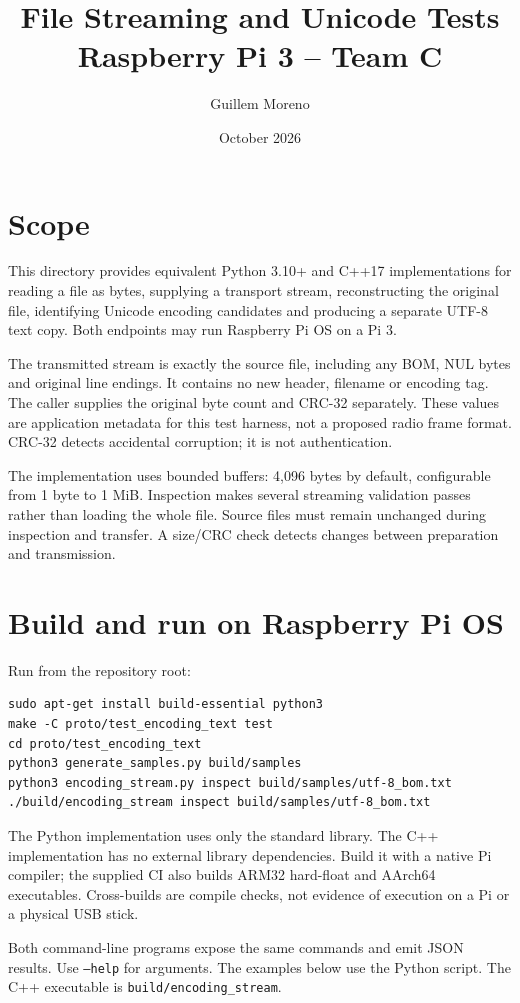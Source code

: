 \documentclass[10pt,a4paper]{article}
\title{File Streaming and Unicode Tests\\\large Raspberry Pi 3 -- Team C}
\author{Guillem Moreno}
\date{October 2026}
\begin{document}
\maketitle
\section{Scope}
This directory provides equivalent Python 3.10+ and C++17 implementations for
reading a file as bytes, supplying a transport stream, reconstructing the original
file, identifying Unicode encoding candidates and producing a separate UTF-8 text
copy. Both endpoints may run Raspberry Pi OS on a Pi 3.

The transmitted stream is exactly the source file, including any BOM, NUL bytes
and original line endings. It contains no new header, filename or encoding tag.
The caller supplies the original byte count and CRC-32 separately. These values
are application metadata for this test harness, not a proposed radio frame format.
CRC-32 detects accidental corruption; it is not authentication.

The implementation uses bounded buffers: 4,096 bytes by default, configurable from
1 byte to 1 MiB. Inspection makes several streaming validation passes rather than
loading the whole file. Source files must remain unchanged during inspection and
transfer. A size/CRC check detects changes between preparation and transmission.

\section{Build and run on Raspberry Pi OS}
Run from the repository root:
\begin{verbatim}
sudo apt-get install build-essential python3
make -C proto/test_encoding_text test
cd proto/test_encoding_text
python3 generate_samples.py build/samples
python3 encoding_stream.py inspect build/samples/utf-8_bom.txt
./build/encoding_stream inspect build/samples/utf-8_bom.txt
\end{verbatim}
The Python implementation uses only the standard library. The C++ implementation
has no external library dependencies. Build it with a native Pi compiler;
the supplied CI also builds ARM32 hard-float and AArch64 executables. Cross-builds
are compile checks, not evidence of execution on a Pi or a physical USB stick.

Both command-line programs expose the same commands and emit JSON results.
Use \texttt{--help} for arguments. The examples below use the Python script.
The C++ executable is \texttt{build/encoding\_stream}.
\end{document}

